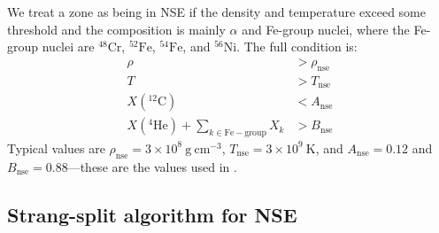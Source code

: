 \documentclass[times,modern]{aastex63}
\newcommand{\isot}[2]{$^{#2}\mathrm{#1}$}
\newcommand{\isotm}[2]{{}^{#2}\mathrm{#1}}
\newcommand{\gcc}{\mathrm{g~cm^{-3} }}
\newcommand{\rhonse}{{\rho_\mathrm{nse}}}
\newcommand{\tnse}{{T_\mathrm{nse}}}
\newcommand{\Anse}{{A_\mathrm{nse}}}
\newcommand{\Bnse}{{B_\mathrm{nse}}}
\begin{document}
We treat a zone as being in NSE if the density and temperature exceed
some threshold and the composition is mainly $\alpha$ and Fe-group
nuclei, where the Fe-group nuclei are \isot{Cr}{48}, \isot{Fe}{52},
\isot{Fe}{54}, and \isot{Ni}{56}.  The full condition is:
\begin{align}
\rho &> \rhonse \\
T &> \tnse \\
X(\isotm{C}{12}) &< \Anse \\
X(\isotm{He}{4}) + \sum_{k \in \mathrm{Fe-group}} X_k &> \Bnse
\end{align}
Typical values are $\rhonse = 3\times 10^8~\gcc$, $T_\mathrm{nse} =
3\times 10^9~\mathrm{K}$, and $\Anse = 0.12$ and $\Bnse=
0.88$---these are the values used in \citet{ma:2013}.

\subsection{Strang-split algorithm for NSE}
\end{document}
